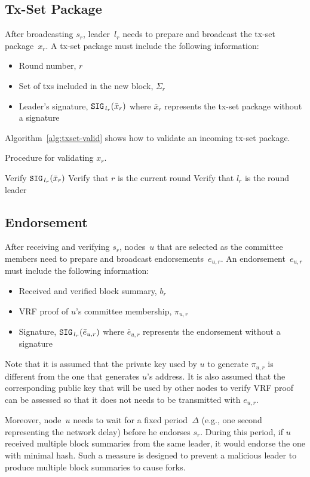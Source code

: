 \documentclass{article}
\begin{document}
\subsection{Tx-Set Package}
After broadcasting $s_r$, leader~$l_r$ needs to prepare and broadcast the tx-set package~$x_r$. A tx-set package must include the following information:
\begin{itemize}
    \item Round number, $r$
    \item Set of txs included in the new block, $\Sigma_r$
    \item Leader's signature, ${\tt SIG}_{\,l_r}(\bar{x}_r)$ where $\bar{x}_r$ represents the tx-set package without a signature
\end{itemize}

Algorithm~\ref{alg:txset-valid} shows how to validate an incoming tx-set package.

\begin{algorithm}[H]
\caption{Procedure for validating $x_r$.}
\label{alg:txset-valid}
\begin{spacing}{1.2}
\begin{algorithmic}[1]
    \vspace{1ex}
    \State Verify ${\tt SIG}_{\,l_r}(\bar{x}_r)$
    \State Verify that $r$ is the current round
    \State Verify that $l_r$ is the round leader
\end{algorithmic}
\end{spacing}
\end{algorithm}

\subsection{Endorsement}

After receiving and verifying $s_r$, nodes~$u$ that are selected as the committee members need to prepare and broadcast endorsements~$e_{u,r}$. An endorsement~$e_{u,r}$ must include the following information:
\begin{itemize}
    \item Received and verified block summary, $b_r$
    \item VRF proof of $u$'s committee membership, $\pi_{u,r}$
    \item Signature, ${\tt SIG}_{\,l_r}(\bar{e}_{u,r})$ where $\bar{e}_{u,r}$ represents the endorsement without a signature
\end{itemize}

{\color{red} Note that it is assumed that the private key used by $u$ to generate $\pi_{u,r}$ is different from the one that generates $u$'s address. It is also assumed that the corresponding public key that will be used by other nodes to verify VRF proof can be assessed so that it does not needs to be transmitted with $e_{u,r}$.

Moreover, node~$u$ needs to wait for a fixed period~$\Delta$ (e.g., one second representing the network delay) before he endorses $s_r$. During this period, if $u$ received multiple block summaries from the same leader, it would endorse the one with minimal hash. Such a measure is designed to prevent a malicious leader to produce multiple block summaries to cause forks.}
\end{document}
